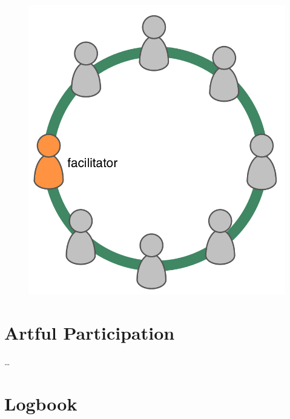 \begin{figure}[htbp]
\centering
\includegraphics[keepaspectratio,width=\textwidth,height=0.75\textheight]{img/circle/facilitator.png}
\end{figure}

\section{Artful Participation}
\label{artfulparticipation}

{\ldots}

\section{Logbook}
\label{logbook}

